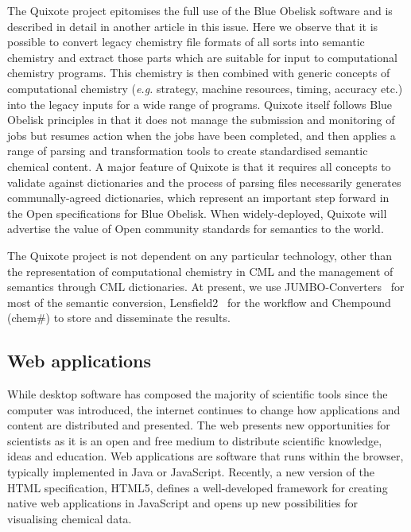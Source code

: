 \documentclass[10pt]{bmc_article}
\newenvironment{bmcformat}{\fussy\setboolean{publ}{true}}{\fussy}
\begin{document}
\begin{bmcformat}
The Quixote project epitomises the full use of the Blue Obelisk
software and is described in detail in another article
in this issue. Here we observe that it is possible
to convert legacy chemistry file formats
of all sorts into semantic chemistry and extract
those parts which are suitable for input to computational chemistry
programs. This chemistry is then combined with
generic concepts of computational chemistry ({\it e.g.} strategy,
machine resources, timing, accuracy etc.) into the
legacy inputs for a wide range of programs. Quixote itself follows
Blue Obelisk principles in that it does not manage
the submission and monitoring of jobs but resumes action when the jobs
have been completed, and then applies a range
of parsing and transformation tools to create standardised semantic
chemical content. A major feature of Quixote is
that it requires all concepts to validate against dictionaries and the
process of parsing files necessarily generates
communally-agreed dictionaries, which represent an important step
forward in the Open specifications for Blue Obelisk.
When widely-deployed, Quixote will advertise the value of Open
community standards for semantics to the world.

The Quixote project is not dependent on any particular technology,
other than the representation of computational
chemistry in CML and the management of semantics through CML
dictionaries. At present, we use JUMBO-Converters~\cite{JUMBO-Converters} for most
 of the semantic conversion, Lensfield2~\cite{Lensfield2} for the workflow and Chempound
(chem\#) \cite{Chempound} to store and disseminate the results.

\subsection*{Web applications}

While desktop software has composed the majority of scientific tools
since the computer was introduced, the internet continues to change
how applications and content are distributed and presented. The web
presents new opportunities for scientists as it is
an open and free medium to distribute scientific knowledge, ideas and
education. Web applications are software that runs within the browser,
typically implemented in Java or JavaScript.
Recently, a new version of the HTML
specification, HTML5, defines a well-developed framework
for creating native web applications in JavaScript and opens up
new possibilities for visualising chemical data.


\end{bmcformat}
\end{document}

